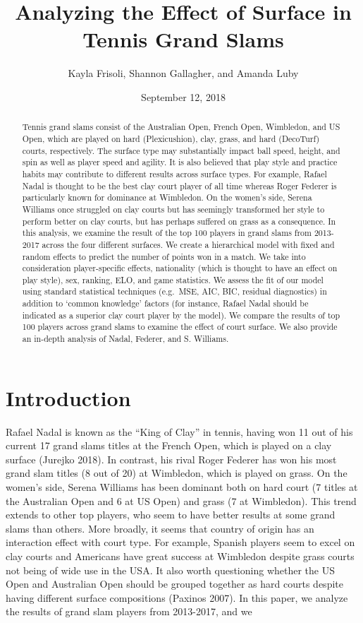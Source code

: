 \documentclass[]{article}
\title{Analyzing the Effect of Surface in Tennis Grand Slams}
\author{Kayla Frisoli, Shannon Gallagher, and Amanda Luby}
\date{September 12, 2018}
\begin{document}
\maketitle
\begin{abstract}
Tennis grand slams consist of the Australian Open, French Open,
Wimbledon, and US Open, which are played on hard (Plexicushion), clay,
grass, and hard (DecoTurf) courts, respectively. The surface type may
substantially impact ball speed, height, and spin as well as player
speed and agility. It is also believed that play style and practice
habits may contribute to different results across surface types. For
example, Rafael Nadal is thought to be the best clay court player of all
time whereas Roger Federer is particularly known for dominance at
Wimbledon. On the women's side, Serena Williams once struggled on clay
courts but has seemingly transformed her style to perform better on clay
courts, but has perhaps suffered on grass as a consequence. In this
analysis, we examine the result of the top 100 players in grand slams
from 2013-2017 across the four different surfaces. We create a
hierarchical model with fixed and random effects to predict the number
of points won in a match. We take into consideration player-specific
effects, nationality (which is thought to have an effect on play style),
sex, ranking, ELO, and game statistics. We assess the fit of our model
using standard statistical techniques (e.g.~MSE, AIC, BIC, residual
diagnostics) in addition to `common knowledge' factors (for instance,
Rafael Nadal should be indicated as a superior clay court player by the
model). We compare the results of top 100 players across grand slams to
examine the effect of court surface. We also provide an in-depth
analysis of Nadal, Federer, and S. Williams.
\end{abstract}

\hypertarget{sec:iintro}{%
\section{Introduction}\label{sec:iintro}}

Rafael Nadal is known as the ``King of Clay'' in tennis, having won 11
out of his current 17 grand slams titles at the French Open, which is
played on a clay surface (Jurejko 2018). In contrast, his rival Roger
Federer has won his most grand slam titles (8 out of 20) at Wimbledon,
which is played on grass. On the women's side, Serena Williams has been
dominant both on hard court (7 titles at the Australian Open and 6 at US
Open) and grass (7 at Wimbledon). This trend extends to other top
players, who seem to have better results at some grand slams than
others. More broadly, it seems that country of origin has an interaction
effect with court type. For example, Spanish players seem to excel on
clay courts and Americans have great success at Wimbledon despite grass
courts not being of wide use in the USA. It also worth questioning
whether the US Open and Australian Open should be grouped together as
hard courts despite having different surface compositions (Paxinos
2007). In this paper, we analyze the results of grand slam players from
2013-2017, and we
\end{document}
